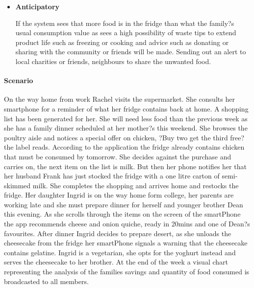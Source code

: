 \documentclass[a4paper, 11pt]{article}
\begin{document}
\begin{itemize}
  \item[] \textbf{Anticipatory} 
    \begin{flushleft}\justify If the system sees that more food is in the fridge than what the family?s usual consumption value as sees a high possibility of waste tips to extend product life such as freezing or cooking and advice such as donating or sharing with the community or friends will be made. Sending out an alert to local charities or friends, neighbours to share the unwanted food. 
\end{flushleft}
\end{itemize}


\paragraph{Scenario}On the way home from work Rachel visits the supermarket. She consults her smartphone for a reminder of what her fridge contains back at home. A shopping list has been generated for her. She will need less food than the previous week as she has a family dinner scheduled at her mother?s this weekend. She browses the poultry aisle and notices a special offer on chicken, ?Buy two get the third free? the label reads. According to the application the fridge already contains chicken that must be consumed by tomorrow. She decides against the purchase and carries on, the next item on the list is milk. But then her phone notifies her that her husband Frank has just stocked the fridge with a one litre carton of semi-skimmed milk. She completes the shopping and arrives home and restocks the fridge. Her daughter Ingrid is on the way home form college, her parents are working late and she must prepare dinner for herself and younger brother Dean this evening. As she scrolls through the items on the screen of the smartPhone the app recommends cheese and onion quiche, ready in 20mins and one of Dean?s favourites. After dinner Ingrid decides to prepare desert, as she unloads the cheesecake from the fridge her smartPhone signals a warning that the cheesecake contains gelatine. Ingrid is a vegetarian, she opts for the yoghurt instead and serves the cheesecake to her brother. At the end of the week a visual chart representing the analysis of the families savings and quantity of food consumed is broadcasted to all members.
\end{document}
